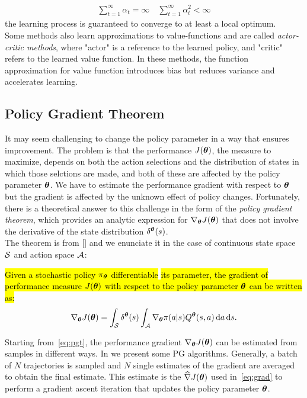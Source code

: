 \begin{align}\sum_{t=1}^{\infty}\alpha_t = \infty \quad \sum_{t=1}^{\infty}\alpha_t^2 < \infty\end{align}
the learning process is guaranteed to converge to at least a local optimum.\\
\newline
Some methods also learn approximations to value-functions and are called \emph{actor-critic methods}, where "actor" is a reference to the learned policy, and "critic" refers to the learned value function. In these methods, the function approximation for value function introduces bias but reduces variance and accelerates learning.

\subsection{Policy Gradient Theorem} \label{subsec:pgt}
It may seem challenging to change the policy parameter in a way that ensures improvement. The problem is that the performance $J(\boldsymbol{\theta})$, \ie the measure to maximize, depends on both the action selections and the distribution of states in which those selctions are made, and both of these are affected by the policy parameter $\boldsymbol{\theta}$. We have to estimate the performance gradient with respect to $\boldsymbol{\theta}$ but the gradient is affected by the unknown effect of policy changes. Fortunately, there is a theoretical answer to this challenge in the form of the \emph{policy gradient theorem}, which provides an analytic expression for $\nabla_{\boldsymbol{\theta}}J(\boldsymbol{\theta})$ that does not involve the derivative of the state distribution $\delta^{\boldsymbol{\theta}}(s)$.\\
\newline
The theorem is from [\cite{Sutton1999PolicyGM}] and we enunciate it in the case of continuous state space $\mathcal{S}$ and action space $\mathcal{A}$:
\begin{theorem}
	\hl{Given a stochastic policy $\pi_{\boldsymbol{\theta}}$ differentiable} \wrt \hl{its parameter, the gradient of performance measure $J(\boldsymbol{\theta})$ with respect to the policy parameter $\boldsymbol{\theta}$ can be written as:}
	\begin{align} 
	\nabla_{\boldsymbol{\theta}}J(\boldsymbol{\theta}) = \int_{\mathcal{S}} \delta^{\boldsymbol{\theta}}(s) \int_{\mathcal{A}} \nabla_{\boldsymbol{\theta}} \pi(a|s) Q^{\boldsymbol{\theta}}(s,a) \,\mathrm{d} a \,\mathrm{d} s. \label{eq:pgt}
	\end{align}
\end{theorem}
\noindent Starting from~\eqref{eq:pgt}, the performance gradient $\nabla_{\boldsymbol{\theta}}J(\boldsymbol{\theta})$ can be estimated from samples in different ways. In  we present some \ac{PG} algorithms. Generally, a batch of $N$ trajectories is sampled and $N$ single estimates of the gradient are averaged to obtain the final estimate. This estimate is the $\widehat{\nabla }J(\boldsymbol{\theta})$ used in~\eqref{eq:grad} to perform a gradient ascent iteration that updates the policy parameter $\boldsymbol{\theta}$.


